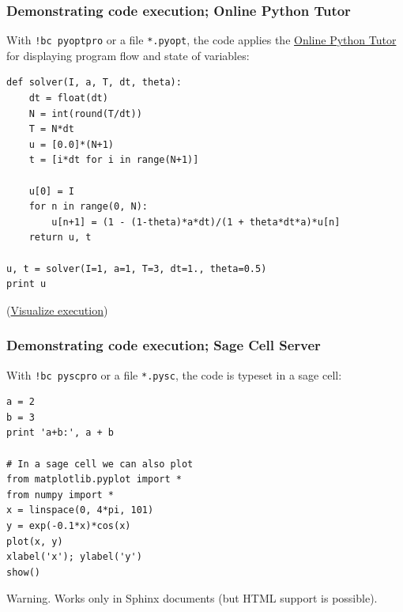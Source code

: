 \documentclass{beamer}
\newenvironment{graybox1admon}[1][]{\begin{block}{#1}}{\end{block}}
\begin{document}
\begin{frame}
\frametitle{Demonstrating code execution; Online Python Tutor}

\label{slide:opt}

With \Verb~!bc pyoptpro~ or a file \Verb!*.pyopt!, the code applies the
\href{{http://pythontutor.com}}{Online Python Tutor} for displaying
program flow and state of variables:

\begin{verbatim}
def solver(I, a, T, dt, theta):
    dt = float(dt)
    N = int(round(T/dt))
    T = N*dt
    u = [0.0]*(N+1)
    t = [i*dt for i in range(N+1)]

    u[0] = I
    for n in range(0, N):
        u[n+1] = (1 - (1-theta)*a*dt)/(1 + theta*dt*a)*u[n]
    return u, t

u, t = solver(I=1, a=1, T=3, dt=1., theta=0.5)
print u
\end{verbatim}
\noindent
(\href{{http://pythontutor.com/visualize.html\#code=def+solver\%28I\%2C+a\%2C+T\%2C+dt\%2C+theta\%29\%3A\%0A++++dt+\%3D+float\%28dt\%29\%0A++++N+\%3D+int\%28round\%28T\%2Fdt\%29\%29\%0A++++T+\%3D+N\%2Adt\%0A++++u+\%3D+\%5B0.0\%5D\%2A\%28N\%2B1\%29\%0A++++t+\%3D+\%5Bi\%2Adt+for+i+in+range\%28N\%2B1\%29\%5D\%0A\%0A++++u\%5B0\%5D+\%3D+I\%0A++++for+n+in+range\%280\%2C+N\%29\%3A\%0A++++++++u\%5Bn\%2B1\%5D+\%3D+\%281+-+\%281-theta\%29\%2Aa\%2Adt\%29\%2F\%281+\%2B+theta\%2Adt\%2Aa\%29\%2Au\%5Bn\%5D\%0A++++return+u\%2C+t\%0A\%0Au\%2C+t+\%3D+solver\%28I\%3D1\%2C+a\%3D1\%2C+T\%3D3\%2C+dt\%3D1.\%2C+theta\%3D0.5\%29\%0Aprint+u&mode=display&cumulative=false&heapPrimitives=false&drawParentPointers=false&textReferences=false&py=2&curInstr=0}}{Visualize execution})
\end{frame}

\begin{frame}
\frametitle{Demonstrating code execution; Sage Cell Server}

\label{slide:sage:cell}

With \Verb~!bc pyscpro~ or a file \Verb!*.pysc!, the code is typeset in
a sage cell:

\begin{verbatim}
a = 2
b = 3
print 'a+b:', a + b

# In a sage cell we can also plot
from matplotlib.pyplot import *
from numpy import *
x = linspace(0, 4*pi, 101)
y = exp(-0.1*x)*cos(x)
plot(x, y)
xlabel('x'); ylabel('y')
show()
\end{verbatim}


\begin{graybox1admon}[Warning.]
Works only in Sphinx documents (but HTML support is possible).
\end{graybox1admon}
\end{frame}
\end{document}
